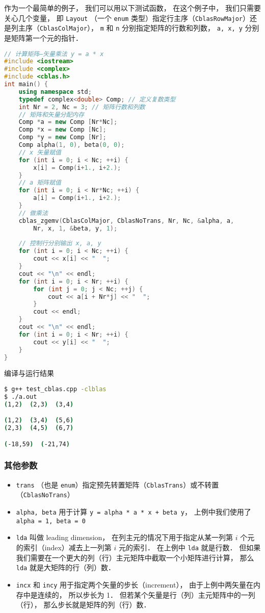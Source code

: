 作为一个最简单的例子， 我们可以用以下测试函数， 在这个例子中， 我们只需要关心几个变量， 即 \lstinline|Layout| （一个 \lstinline|enum| 类型）指定行主序（\lstinline|CblasRowMajor|）还是列主序（\lstinline|CblasColMajor|）， \lstinline|m| 和 \lstinline|n| 分别指定矩阵的行数和列数， \lstinline|a, x, y| 分别是矩阵第一个元的指针．
\begin{lstlisting}[language=cpp]
// 计算矩阵—矢量乘法 y = a * x
#include <iostream>
#include <complex>
#include <cblas.h>
int main() {
    using namespace std;
    typedef complex<double> Comp; // 定义复数类型
    int Nr = 2, Nc = 3; // 矩阵行数和列数
    // 矩阵和矢量分配内存
    Comp *a = new Comp [Nr*Nc];
    Comp *x = new Comp [Nc];
    Comp *y = new Comp [Nr];
    Comp alpha(1, 0), beta(0, 0);
    // x 矢量赋值
    for (int i = 0; i < Nc; ++i) {
        x[i] = Comp(i+1., i+2.);
    }
    // a 矩阵赋值
    for (int i = 0; i < Nr*Nc; ++i) {
        a[i] = Comp(i+1., i+2.);
    }
    // 做乘法
    cblas_zgemv(CblasColMajor, CblasNoTrans, Nr, Nc, &alpha, a,
        Nr, x, 1, &beta, y, 1);
        
    // 控制行分别输出 x, a, y
    for (int i = 0; i < Nc; ++i) {
        cout << x[i] << "  ";
    }
    cout << "\n" << endl;
    for (int i = 0; i < Nr; ++i) {
        for (int j = 0; j < Nc; ++j) {
            cout << a[i + Nr*j] << "  ";
        }
        cout << endl;
    }
    cout << "\n" << endl;
    for (int i = 0; i < Nr; ++i) {
        cout << y[i] << "  ";
    }
}
\end{lstlisting}

编译与运行结果
\begin{lstlisting}[language=bash]
$ g++ test_cblas.cpp -clblas
$ ./a.out
(1,2)  (2,3)  (3,4)

(1,2)  (3,4)  (5,6)
(2,3)  (4,5)  (6,7)

(-18,59)  (-21,74)
\end{lstlisting}

\subsubsection{其他参数}
\begin{itemize}
\item \lstinline|trans| （也是 \lstinline|enum|）指定预先转置矩阵（\lstinline|CblasTrans|）或不转置（\lstinline|CblasNoTrans|）
\item \lstinline|alpha, beta| 用于计算 \lstinline|y = alpha * a * x + beta y|， 上例中我们使用了 \lstinline|alpha = 1, beta = 0|
\item \lstinline|lda| 叫做 leading dimension， 在列主元的情况下用于指定从某一列第 $i$ 个元的索引（index）减去上一列第 $i$ 元的索引． 在上例中 \lstinline|lda| 就是行数． 但如果我们需要在一个更大的列（行）主元矩阵中截取一个小矩阵进行计算， 那么 \lstinline|lda| 就是大矩阵的行（列）数．
\item \lstinline|incx| 和 \lstinline|incy| 用于指定两个矢量的步长（increment）， 由于上例中两矢量在内存中是连续的， 所以步长为 1． 但若某个矢量是行（列）主元矩阵中的一列（行）， 那么步长就是矩阵的列（行）数．
\end{itemize}
